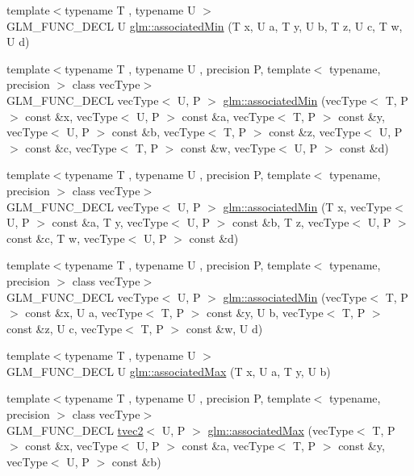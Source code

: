 \begin{DoxyCompactItemize}
\item 
{\footnotesize template$<$typename T , typename U $>$ }\\G\+L\+M\+\_\+\+F\+U\+N\+C\+\_\+\+D\+E\+CL U \hyperlink{group__gtx__associated__min__max_ga432224ebe2085eaa2b63a077ecbbbff6}{glm\+::associated\+Min} (T x, U a, T y, U b, T z, U c, T w, U d)
\item 
{\footnotesize template$<$typename T , typename U , precision P, template$<$ typename, precision $>$ class vec\+Type$>$ }\\G\+L\+M\+\_\+\+F\+U\+N\+C\+\_\+\+D\+E\+CL vec\+Type$<$ U, P $>$ \hyperlink{group__gtx__associated__min__max_ga88e031f22b80215505928900d3dde549}{glm\+::associated\+Min} (vec\+Type$<$ T, P $>$ const \&x, vec\+Type$<$ U, P $>$ const \&a, vec\+Type$<$ T, P $>$ const \&y, vec\+Type$<$ U, P $>$ const \&b, vec\+Type$<$ T, P $>$ const \&z, vec\+Type$<$ U, P $>$ const \&c, vec\+Type$<$ T, P $>$ const \&w, vec\+Type$<$ U, P $>$ const \&d)
\item 
{\footnotesize template$<$typename T , typename U , precision P, template$<$ typename, precision $>$ class vec\+Type$>$ }\\G\+L\+M\+\_\+\+F\+U\+N\+C\+\_\+\+D\+E\+CL vec\+Type$<$ U, P $>$ \hyperlink{group__gtx__associated__min__max_ga0f63b0dce5a5c3242cc6d9847e7d14f1}{glm\+::associated\+Min} (T x, vec\+Type$<$ U, P $>$ const \&a, T y, vec\+Type$<$ U, P $>$ const \&b, T z, vec\+Type$<$ U, P $>$ const \&c, T w, vec\+Type$<$ U, P $>$ const \&d)
\item 
{\footnotesize template$<$typename T , typename U , precision P, template$<$ typename, precision $>$ class vec\+Type$>$ }\\G\+L\+M\+\_\+\+F\+U\+N\+C\+\_\+\+D\+E\+CL vec\+Type$<$ U, P $>$ \hyperlink{group__gtx__associated__min__max_ga00a949fd345f4b31b259f033d3ab4a1c}{glm\+::associated\+Min} (vec\+Type$<$ T, P $>$ const \&x, U a, vec\+Type$<$ T, P $>$ const \&y, U b, vec\+Type$<$ T, P $>$ const \&z, U c, vec\+Type$<$ T, P $>$ const \&w, U d)
\item 
{\footnotesize template$<$typename T , typename U $>$ }\\G\+L\+M\+\_\+\+F\+U\+N\+C\+\_\+\+D\+E\+CL U \hyperlink{group__gtx__associated__min__max_ga7d9c8785230c8db60f72ec8975f1ba45}{glm\+::associated\+Max} (T x, U a, T y, U b)
\item 
{\footnotesize template$<$typename T , typename U , precision P, template$<$ typename, precision $>$ class vec\+Type$>$ }\\G\+L\+M\+\_\+\+F\+U\+N\+C\+\_\+\+D\+E\+CL \hyperlink{structglm_1_1tvec2}{tvec2}$<$ U, P $>$ \hyperlink{group__gtx__associated__min__max_ga10ba6001798f42a0f941f19ff30e066a}{glm\+::associated\+Max} (vec\+Type$<$ T, P $>$ const \&x, vec\+Type$<$ U, P $>$ const \&a, vec\+Type$<$ T, P $>$ const \&y, vec\+Type$<$ U, P $>$ const \&b)

\end{DoxyCompactItemize}
